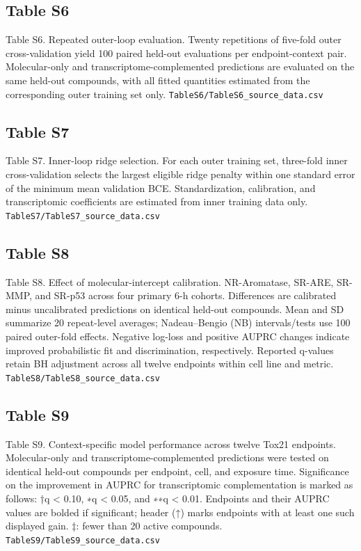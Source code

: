 \documentclass{article}
\begin{document}
\subsection*{Table S6}
Table S6. Repeated outer-loop evaluation. Twenty repetitions of five-fold outer cross-validation yield 100 paired held-out evaluations per endpoint-context pair. Molecular-only and transcriptome-complemented predictions are evaluated on the same held-out compounds, with all fitted quantities estimated from the corresponding outer training set only.
\texttt{TableS6/TableS6_source_data.csv}
\subsection*{Table S7}
Table S7. Inner-loop ridge selection. For each outer training set, three-fold inner cross-validation selects the largest eligible ridge penalty within one standard error of the minimum mean validation BCE. Standardization, calibration, and transcriptomic coefficients are estimated from inner training data only.
\texttt{TableS7/TableS7_source_data.csv}
\subsection*{Table S8}
Table S8. Effect of molecular-intercept calibration. NR-Aromatase, SR-ARE, SR-MMP, and SR-p53 across four primary 6-h cohorts. Differences are calibrated minus uncalibrated predictions on identical held-out compounds. Mean and SD summarize 20 repeat-level averages; Nadeau–Bengio (NB) intervals/tests use 100 paired outer-fold effects. Negative log-loss and positive AUPRC changes indicate improved probabilistic fit and discrimination, respectively. Reported q-values retain BH adjustment across all twelve endpoints within cell line and metric.
\texttt{TableS8/TableS8_source_data.csv}
\subsection*{Table S9}
Table S9. Context-specific model performance across twelve Tox21 endpoints. Molecular-only and transcriptome-complemented predictions were tested on identical held-out compounds per endpoint, cell, and exposure time. Significance on the improvement in AUPRC for transcriptomic complementation is marked as follows: †q < 0.10, ∗q < 0.05, and ∗∗q < 0.01. Endpoints and their AUPRC values are bolded if significant; header (↑) marks endpoints with at least one such displayed gain. ‡: fewer than 20 active compounds.
\texttt{TableS9/TableS9_source_data.csv}
\end{document}
